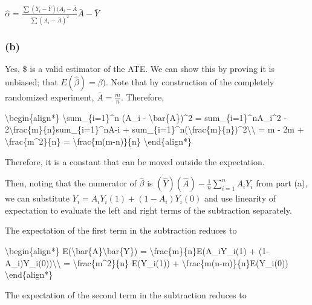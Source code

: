 \documentclass[
  11pt,
  letterpaper,
  DIV=11,
  numbers=noendperiod]{scrartcl}
\newenvironment{Shaded}{}{}
\newcommand{\NormalTok}[1]{\textcolor[rgb]{0.24,0.22,0.21}{#1}}
\begin{document}
\(\hat{\alpha} = \frac{\sum(Y_i - \bar{Y})(A_i - \bar{A}}{\sum(A_i - \bar{A})^2}\bar{A} - \bar{Y}\)

\hypertarget{b-2}{%
\subsubsection{(b)}\label{b-2}}

Yes, \$\hat{\beta} is a valid estimator of the ATE. We can show this by
proving it is unbiased; that \(E(\hat{\beta}) = \beta)\). Note that by
construction of the completely randomized experiment,
\(\bar{A} = \frac{m}{n}\). Therefore,

\begin{Shaded}
\begin{Highlighting}[]
\NormalTok{\textbackslash{}begin\{align*\}}
\NormalTok{\textbackslash{}sum\_\{i=1\}\^{}n (A\_i {-} \textbackslash{}bar\{A\})\^{}2 = sum\_\{i=1\}\^{}nA\_i\^{}2 {-} 2\textbackslash{}frac\{m\}\{n\}sum\_\{i=1\}\^{}nA{-}i + sum\_\{i=1\}\^{}n(\textbackslash{}frac\{m\}\{n\})\^{}2\textbackslash{}\textbackslash{}}
\NormalTok{= m {-} 2m + \textbackslash{}frac\{m\^{}2\}\{n\} = \textbackslash{}frac\{m(m{-}n)\}\{n\}}
\NormalTok{\textbackslash{}end\{align*\}}
\end{Highlighting}
\end{Shaded}

Therefore, it is a constant that can be moved outside the expectation.

Then, noting that the numerator of \(\hat{\beta}\) is
\((\hat{Y})(\hat{A}) - \frac{1}{n}\sum_{i=1}^n A_i Y_i\) from part (a),
we can substitute \(Y_i = A_i Y_i(1) + (1 - A_i) Y_i(0)\) and use
linearity of expectation to evaluate the left and right terms of the
subtraction separately.

The expectation of the first term in the subtraction reduces to

\begin{Shaded}
\begin{Highlighting}[]
\NormalTok{\textbackslash{}begin\{align*\}}
\NormalTok{E(\textbackslash{}bar\{A\}\textbackslash{}bar\{Y\}) = \textbackslash{}frac\{m\}\{n\}E(A\_iY\_i(1) + (1{-}A\_i)Y\_i(0))\textbackslash{}\textbackslash{}}
\NormalTok{= \textbackslash{}frac\{m\^{}2\}\{n\} E(Y\_i(1)) + \textbackslash{}frac\{m(n{-}m)\}\{n\}E(Y\_i(0))}
\NormalTok{\textbackslash{}end\{align*\}}
\end{Highlighting}
\end{Shaded}

The expectation of the second term in the subtraction reduces to
\end{document}
